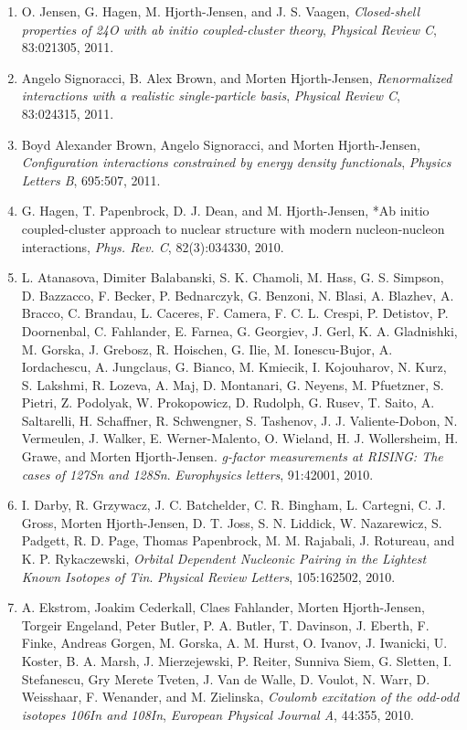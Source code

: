 \documentclass[a4wide,10pt]{article}
\begin{document}
\begin{enumerate}
\item O. Jensen, G. Hagen, M. Hjorth-Jensen, and J. S. Vaagen,  \emph{Closed-shell properties of 24O with ab initio coupled-cluster theory},  \emph{Physical Review C}, 83:021305, 2011. 

\item Angelo Signoracci, B. Alex Brown, and Morten Hjorth-Jensen,  \emph{Renormalized interactions with a realistic single-particle   basis},  \emph{Physical Review C}, 83:024315, 2011.   

\item Boyd Alexander Brown, Angelo Signoracci, and Morten Hjorth-Jensen,  \emph{Configuration interactions constrained by energy density  functionals},  \emph{Physics Letters B}, 695:507, 2011.  

\item G. Hagen, T. Papenbrock, D. J. Dean, and M. Hjorth-Jensen,  *Ab initio coupled-cluster approach to nuclear structure with modern   nucleon-nucleon interactions,  \emph{Phys. Rev. C}, 82(3):034330, 2010.  

\item L. Atanasova, Dimiter Balabanski, S. K. Chamoli, M. Hass, G. S. Simpson,   D. Bazzacco, F. Becker, P. Bednarczyk, G. Benzoni, N. Blasi, A. Blazhev,   A. Bracco, C. Brandau, L. Caceres, F. Camera, F. C. L. Crespi, P. Detistov,   P. Doornenbal, C. Fahlander, E. Farnea, G. Georgiev, J. Gerl, K. A.   Gladnishki, M. Gorska, J. Grebosz, R. Hoischen, G. Ilie, M. Ionescu-Bujor,   A. Iordachescu, A. Jungclaus, G. Bianco, M. Kmiecik, I. Kojouharov, N. Kurz,   S. Lakshmi, R. Lozeva, A. Maj, D. Montanari, G. Neyens, M. Pfuetzner,   S. Pietri, Z. Podolyak, W. Prokopowicz, D. Rudolph, G. Rusev, T. Saito,   A. Saltarelli, H. Schaffner, R. Schwengner, S. Tashenov, J. J.   Valiente-Dobon, N. Vermeulen, J. Walker, E. Werner-Malento, O. Wieland, H. J.   Wollersheim, H. Grawe, and Morten Hjorth-Jensen.  \emph{g-factor measurements at RISING: The cases of 127Sn and   128Sn}.  \emph{Europhysics letters}, 91:42001, 2010. 

\item I. Darby, R. Grzywacz, J. C. Batchelder, C. R. Bingham, L. Cartegni, C. J.   Gross, Morten Hjorth-Jensen, D. T. Joss, S. N. Liddick, W. Nazarewicz,   S. Padgett, R. D. Page, Thomas Papenbrock, M. M. Rajabali, J. Rotureau, and   K. P. Rykaczewski, \emph{Orbital Dependent Nucleonic Pairing in the Lightest Known   Isotopes of Tin}.  \emph{Physical Review Letters}, 105:162502, 2010. 

\item A. Ekstrom, Joakim Cederkall, Claes Fahlander, Morten Hjorth-Jensen, Torgeir   Engeland, Peter Butler, P. A. Butler, T. Davinson, J. Eberth, F. Finke,   Andreas Gorgen, M. Gorska, A. M. Hurst, O. Ivanov, J. Iwanicki, U. Koster,   B. A. Marsh, J. Mierzejewski, P. Reiter, Sunniva Siem, G. Sletten,   I. Stefanescu, Gry Merete Tveten, J. Van de Walle, D. Voulot, N. Warr,   D. Weisshaar, F. Wenander, and M. Zielinska, \emph{Coulomb excitation of the odd-odd isotopes 106In and 108In},  \emph{European Physical Journal A}, 44:355, 2010. 


\end{enumerate}
\end{document}
